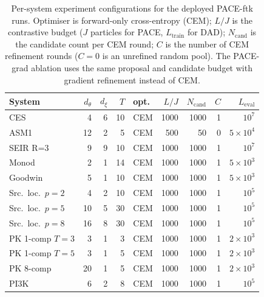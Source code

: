 \begin{table}[h]
\centering\footnotesize
\caption[Experiment configurations]{Per-system experiment configurations for the
deployed PACE-ftk runs. Optimiser is forward-only cross-entropy (CEM); $L/J$ is the
contrastive budget ($J$ particles for PACE, $L_{\mathrm{train}}$ for DAD);
$N_{\mathrm{cand}}$ is the candidate count per CEM round; $C$ is the number of CEM
refinement rounds ($C{=}0$ is an unrefined random pool). The PACE-grad ablation uses the
same proposal and candidate budget with gradient refinement instead of CEM.}
\label{tab:config}
\begin{tabular}{lrrrlrrrr}
\toprule
System & $d_\theta$ & $d_\xi$ & $T$ & opt. & $L/J$ & $N_{\mathrm{cand}}$ & $C$ & $L_{\mathrm{eval}}$ \\
\midrule
CES & 4 & 6 & 10 & CEM & 1000 & 1000 & 1 & $10^7$ \\
ASM1 & 12 & 2 & 5 & CEM & 500 & 50 & 0 & $5{\times}10^4$ \\
SEIR R=3 & 9 & 9 & 10 & CEM & 1000 & 1000 & 1 & $10^7$ \\
Monod & 2 & 1 & 14 & CEM & 1000 & 1000 & 1 & $5{\times}10^3$ \\
Goodwin & 5 & 1 & 10 & CEM & 1000 & 1000 & 1 & $5{\times}10^3$ \\
Src.\ loc.\ $p{=}2$ & 4 & 2 & 10 & CEM & 1000 & 1000 & 1 & $10^5$ \\
Src.\ loc.\ $p{=}5$ & 10 & 5 & 30 & CEM & 1000 & 1000 & 1 & $10^5$ \\
Src.\ loc.\ $p{=}8$ & 16 & 8 & 30 & CEM & 1000 & 1000 & 1 & $10^5$ \\
PK 1-comp $T{=}3$ & 3 & 1 & 3 & CEM & 1000 & 1000 & 1 & $2{\times}10^3$ \\
PK 1-comp $T{=}5$ & 3 & 1 & 5 & CEM & 1000 & 1000 & 1 & $2{\times}10^3$ \\
PK 8-comp & 20 & 1 & 5 & CEM & 1000 & 1000 & 1 & $2{\times}10^3$ \\
PI3K & 6 & 2 & 8 & CEM & 1000 & 1000 & 1 & $10^5$ \\
\bottomrule
\end{tabular}
\end{table}

